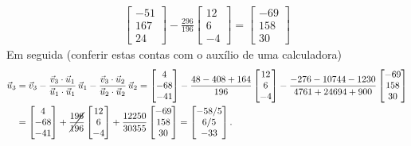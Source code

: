 \documentclass[../livro.tex]{subfiles}  %
\begin{document}
\begin{example}
\begin{align*}
\begin{bmatrix}
 -51  \\
 167  \\
 24
\end{bmatrix} - \frac{296}{196}
\begin{bmatrix}
12 \\
6 \\
-4
\end{bmatrix} =
\begin{bmatrix}
 -69  \\
 158  \\
 30
\end{bmatrix}
  \end{align*}
 Em seguida (conferir estas contas com o auxílio de uma calculadora)
  \begin{align*}
\vec{u}_3 & = \vec{v}_3 - \frac{\vec{v}_3 \cdot \vec{u}_1}{\vec{u}_1 \cdot \vec{u}_1} \, \vec{u}_1 - \frac{\vec{v}_3 \cdot \vec{u}_2}{\vec{u}_2 \cdot \vec{u}_2} \, \vec{u}_2 = \begin{bmatrix}
  4 \\
 -68 \\
 -41
\end{bmatrix} - \frac{48-408 + 164}{196}
\begin{bmatrix}
12 \\
6 \\
-4
\end{bmatrix} - \frac{-276 - 10744 - 1230}{4761 + 24694 + 900}
\begin{bmatrix}
 -69  \\
 158  \\
 30
\end{bmatrix} \\
   & = \begin{bmatrix}
  4 \\
 -68 \\
 -41
\end{bmatrix} + \cancel{\frac{196}{196}}
\begin{bmatrix}
12 \\
6 \\
-4
\end{bmatrix} + \frac{12250}{30355}
\begin{bmatrix}
 -69  \\
 158  \\
 30
\end{bmatrix} = \begin{bmatrix}
 -58/5  \\
 6/5  \\
 -33
\end{bmatrix}.

\end{align*}
\end{example}
\end{document}
